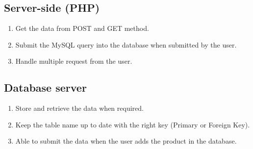 \subsection{Server-side (PHP)}
\begin{enumerate}
    \item Get the data from POST and GET method.
    \item Submit the MySQL query into the database when submitted by the user.
    \item Handle multiple request from the user.
\end{enumerate}

\subsection{Database server}
\begin{enumerate}
    \item Store and retrieve the data when required.
    \item Keep the table name up to date with the right key (Primary or Foreign Key).
    \item Able to submit the data when the user adds the product in the database.
\end{enumerate}